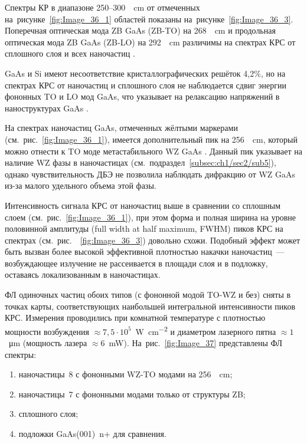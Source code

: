 Спектры КР в диапазоне 250--300~\si{\per\centi\metre} от отмеченных
на~рисунке~\cref{fig:Image_36_1} областей показаны
на~рисунке~\cref{fig:Image_36_3}. Поперечная оптическая мода ZB GaAs (ZB-TO) на
268~\si{\per\centi\metre} и продольная оптическая мода ZB GaAs (ZB-LO) на
292~\si{\per\centi\metre} различимы на спектрах КРС от сплошного слоя и всех
наночастиц \cite{Signorello2014}.

GaAs и Si имеют несоответствие кристаллографических решёток 4,2\%, но на
спектрах КРС от наночастиц и сплошного слоя не наблюдается сдвиг энергии
фононных TO и LO мод GaAs, что указывает на релаксацию напряжений в
наноструктурах GaAs \cite{Alekseev2017}.

На спектрах наночастиц GaAs, отмеченных жёлтыми маркерами
(см.~рис.~\cref{fig:Image_36_1}), имеется дополнительный пик на
256~\si{\per\centi\metre}, который можно отнести к TO моде метастабильного WZ
GaAs \cite{Fu2004}. Данный пик указывает на наличие WZ фазы в наночастицах
(см.~подраздел~\cref{subsec:ch1/sec2/sub5}), однако чувствительность ДБЭ не
позволила наблюдать дифракцию от WZ GaAs из-за малого удельного объема этой
фазы.

Интенсивность сигнала КРС от наночастиц выше в сравнении со сплошным слоем
(см.~рис.~\cref{fig:Image_36_1}), при этом форма и полная ширина на уровне
половинной амплитуды (full width at half maximum, FWHM) пиков КРС на спектрах
(см.~рис.~~\cref{fig:Image_36_3}) довольно схожи. Подобный эффект может быть
вызван более высокой эффективной плотностью накачки наночастиц~--- возбуждающее
излучение не рассеивается в площади слоя и в подложку, оставаясь локализованным
в наночастицах.

ФЛ одиночных частиц обоих типов (с фононной модой TO-WZ и без) сняты в точках
карты, соответствующих наибольшей интегральной интенсивности пиков КРС.
Измерения проводились при комнатной температуре с плотностью мощности
возбуждения \(\approx 7,5 \cdot 10^5\)~\si{\watt\per\centi\metre\squared} и
диаметром лазерного пятна \(\approx 1\)~\si{\micro\metre} (мощность лазера
\(\approx 6\)~\si{\milli\watt}). На~рис.~\cref{fig:Image_37} представлены ФЛ
спектры: \begin{enumerate}[beginpenalty=10000] \item наночастицы~8 с фононными
	WZ-TO модами на 256~\si{\per\centi\metre}; \item наночастицы~7 с фононными
	модами только от структуры ZB; \item сплошного слоя; \item подложки
	GaAs(001)~n+ для сравнения.  \end{enumerate}

